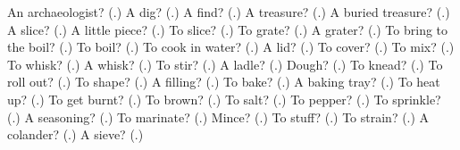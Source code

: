 \begin{tcolorbox}[breakable,colback=teal!4,colframe=teal!35!black,title={Before you move on}]
An archaeologist? (\textbf{}.) A dig? (\textbf{}.) A find? (\textbf{}.) A treasure? (\textbf{}.) A buried treasure? (\textbf{}.) A slice? (\textbf{}.) A little piece? (\textbf{}.) To slice? (\textbf{}.) To grate? (\textbf{}.) A grater? (\textbf{}.) To bring to the boil? (\textbf{}.) To boil? (\textbf{}.) To cook in water? (\textbf{}.) A lid? (\textbf{}.) To cover? (\textbf{}.) To mix? (\textbf{}.) To whisk? (\textbf{}.) A whisk? (\textbf{}.) To stir? (\textbf{}.) A ladle? (\textbf{}.) Dough? (\textbf{}.) To knead? (\textbf{}.) To roll out? (\textbf{}.) To shape? (\textbf{}.) A filling? (\textbf{}.) To bake? (\textbf{}.) A baking tray? (\textbf{}.) To heat up? (\textbf{}.) To get burnt? (\textbf{}.) To brown? (\textbf{}.) To salt? (\textbf{}.) To pepper? (\textbf{}.) To sprinkle? (\textbf{}.) A seasoning? (\textbf{}.) To marinate? (\textbf{}.) Mince? (\textbf{}.) To stuff? (\textbf{}.) To strain? (\textbf{}.) A colander? (\textbf{}.) A sieve? (\textbf{}.)
\end{tcolorbox}
